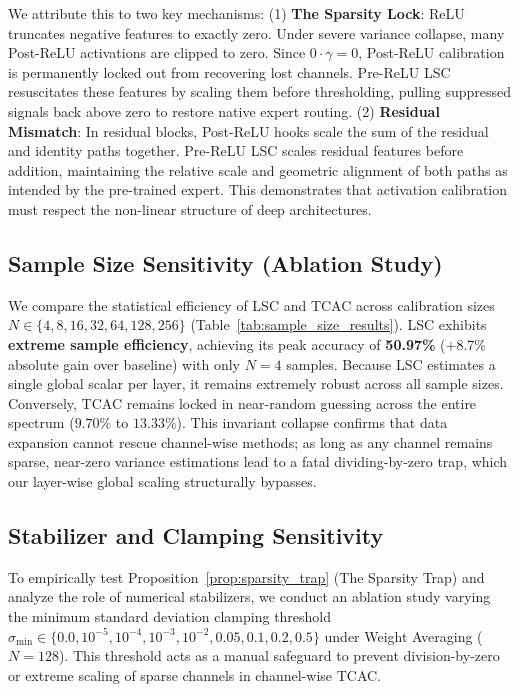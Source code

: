 \documentclass{article}
\theoremstyle{plain}
\theoremstyle{definition}
\theoremstyle{remark}
\begin{document}
We attribute this to two key mechanisms: (1) \textbf{The Sparsity Lock}: ReLU truncates negative features to exactly zero. Under severe variance collapse, many Post-ReLU activations are clipped to zero. Since $0 \cdot \gamma = 0$, Post-ReLU calibration is permanently locked out from recovering lost channels. Pre-ReLU LSC resuscitates these features by scaling them before thresholding, pulling suppressed signals back above zero to restore native expert routing. (2) \textbf{Residual Mismatch}: In residual blocks, Post-ReLU hooks scale the sum of the residual and identity paths together. Pre-ReLU LSC scales residual features before addition, maintaining the relative scale and geometric alignment of both paths as intended by the pre-trained expert. This demonstrates that activation calibration must respect the non-linear structure of deep architectures.

\subsection{Sample Size Sensitivity (Ablation Study)}
\label{sec:sample_size}
We compare the statistical efficiency of LSC and TCAC across calibration sizes $N \in \{4, 8, 16, 32, 64, 128, 256\}$ (Table~\ref{tab:sample_size_results}). LSC exhibits \textbf{extreme sample efficiency}, achieving its peak accuracy of \textbf{50.97\%} (+8.7\% absolute gain over baseline) with only $N=4$ samples. Because LSC estimates a single global scalar per layer, it remains extremely robust across all sample sizes. Conversely, TCAC remains locked in near-random guessing across the entire spectrum ($9.70\%$ to $13.33\%$). This invariant collapse confirms that data expansion cannot rescue channel-wise methods; as long as any channel remains sparse, near-zero variance estimations lead to a fatal dividing-by-zero trap, which our layer-wise global scaling structurally bypasses.

\subsection{Stabilizer and Clamping Sensitivity}
\label{sec:stabilizer}
To empirically test Proposition~\ref{prop:sparsity_trap} (The Sparsity Trap) and analyze the role of numerical stabilizers, we conduct an ablation study varying the minimum standard deviation clamping threshold $\sigma_{\min} \in \{0.0, 10^{-5}, 10^{-4}, 10^{-3}, 10^{-2}, 0.05, 0.1, 0.2, 0.5\}$ under Weight Averaging ($N=128$). This threshold acts as a manual safeguard to prevent division-by-zero or extreme scaling of sparse channels in channel-wise TCAC.
\end{document}
